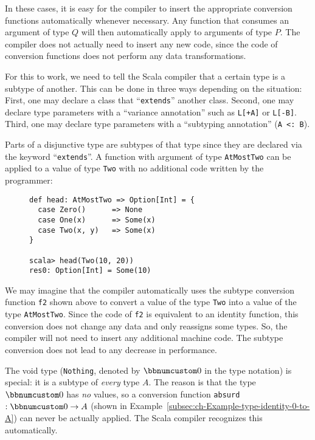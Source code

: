In these cases, it is easy for the compiler to insert the appropriate
conversion functions automatically whenever necessary. Any function
that consumes an argument of type $Q$ will then automatically apply
to arguments of type $P$. The compiler does not actually need to
insert any new code, since the code of conversion functions does not
perform any data transformations.

For this to work, we need to tell the Scala compiler that a certain
type is a subtype of another. This can be done in three ways depending
on the situation: First, one may declare a class that \textsf{``}\lstinline!extends!\textsf{''}
another class. Second, one may declare type parameters with a \textsf{``}variance
annotation\textsf{''} such as \lstinline!L[+A]! or \lstinline!L[-B]!. Third,
one may declare type parameters with a \textsf{``}subtyping annotation\textsf{''}
(\lstinline!A <: B!).

Parts of a disjunctive type are subtypes of that type since they are
declared via the keyword \textsf{``}\lstinline!extends!\textsf{''}. A
function with argument of type \lstinline!AtMostTwo! can be applied
to a value of type \lstinline!Two! with no additional code written
by the programmer:

\begin{wrapfigure}{l}{0.4\columnwidth}%
\vspace{-0.5\baselineskip}
\begin{lstlisting}
def head: AtMostTwo => Option[Int] = {
  case Zero()      => None
  case One(x)      => Some(x)
  case Two(x, y)   => Some(x)
}

scala> head(Two(10, 20))
res0: Option[Int] = Some(10)
\end{lstlisting}

\vspace{-1\baselineskip}
\end{wrapfigure}%

\noindent We may imagine that the compiler automatically uses the
subtype conversion function \lstinline!f2! shown above to convert
a value of the type \lstinline!Two! into a value of the type \lstinline!AtMostTwo!.
Since the code of \lstinline!f2! is equivalent to an identity function,
this conversion does not change any data and only reassigns some types.
So, the compiler will not need to insert any additional machine code.
The subtype conversion does not lead to any decrease in performance.

The void type (\lstinline!Nothing!, denoted by $\bbnum 0$ in the
type notation) is special: it is a subtype of \emph{every}
type $A$. The reason is that the type $\bbnum 0$ has \emph{no} values,
so a conversion function \lstinline!absurd! $:\bbnum 0\rightarrow A$
(shown in Example~\ref{subsec:ch-Example-type-identity-0-to-A})
can never be actually applied. The Scala compiler recognizes this
automatically.

